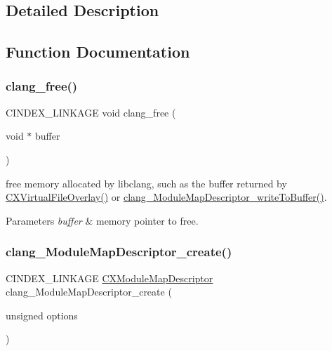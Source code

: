 \subsection{Detailed Description}


\subsection{Function Documentation}
\mbox{\label{group__BUILD__SYSTEM_ga3d7fcaba04ff8fcc4882e1bab6dcbee8}} 
\subsubsection{\texorpdfstring{clang\+\_\+free()}{clang\_free()}}
{\footnotesize\ttfamily C\+I\+N\+D\+E\+X\+\_\+\+L\+I\+N\+K\+A\+GE void clang\+\_\+free (\begin{DoxyParamCaption}\item[{void $\ast$}]{buffer }\end{DoxyParamCaption})}



free memory allocated by libclang, such as the buffer returned by {\ttfamily \hyperlink{group__BUILD__SYSTEM_gae854e36ceb0a02071e557e19f908772d}{C\+X\+Virtual\+File\+Overlay()}} or {\ttfamily \hyperlink{group__BUILD__SYSTEM_gacaeaf475a29b16a041641b6ebe9a012d}{clang\+\_\+\+Module\+Map\+Descriptor\+\_\+write\+To\+Buffer()}}. 


\begin{DoxyParams}{Parameters}
{\em buffer} & memory pointer to free. \\
\hline
\end{DoxyParams}
\mbox{\label{group__BUILD__SYSTEM_ga41bcb2ce427f6892d48bc21117b22274}} 
\subsubsection{\texorpdfstring{clang\+\_\+\+Module\+Map\+Descriptor\+\_\+create()}{clang\_ModuleMapDescriptor\_create()}}
{\footnotesize\ttfamily C\+I\+N\+D\+E\+X\+\_\+\+L\+I\+N\+K\+A\+GE \hyperlink{group__BUILD__SYSTEM_ga8d7eea7855a8d1118218c7661469b3db}{C\+X\+Module\+Map\+Descriptor} clang\+\_\+\+Module\+Map\+Descriptor\+\_\+create (\begin{DoxyParamCaption}\item[{unsigned}]{options }\end{DoxyParamCaption})}



